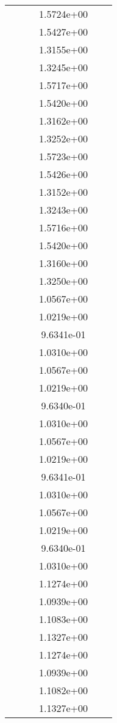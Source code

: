 \begin{xltabular}{\textwidth}{r|rS[table-format=1.3e+2]S[table-format=1.4e+2]S[table-format=1.4e+2]S[table-format=-1.5]}
&  &  & 1.5724e+00 & & \\
&  &  & 1.5427e+00 & & \\
&  &  & 1.3155e+00 & & \\
&  &  & 1.3245e+00 & & \\
&  &  & 1.5717e+00 & & \\
&  &  & 1.5420e+00 & & \\
&  &  & 1.3162e+00 & & \\
&  &  & 1.3252e+00 & & \\
&  &  & 1.5723e+00 & & \\
&  &  & 1.5426e+00 & & \\
&  &  & 1.3152e+00 & & \\
&  &  & 1.3243e+00 & & \\
&  &  & 1.5716e+00 & & \\
&  &  & 1.5420e+00 & & \\
&  &  & 1.3160e+00 & & \\
&  &  & 1.3250e+00 & & \\
&  &  & 1.0567e+00 & & \\
&  &  & 1.0219e+00 & & \\
&  &  & 9.6341e-01 & & \\
&  &  & 1.0310e+00 & & \\
&  &  & 1.0567e+00 & & \\
&  &  & 1.0219e+00 & & \\
&  &  & 9.6340e-01 & & \\
&  &  & 1.0310e+00 & & \\
&  &  & 1.0567e+00 & & \\
&  &  & 1.0219e+00 & & \\
&  &  & 9.6341e-01 & & \\
&  &  & 1.0310e+00 & & \\
&  &  & 1.0567e+00 & & \\
&  &  & 1.0219e+00 & & \\
&  &  & 9.6340e-01 & & \\
&  &  & 1.0310e+00 & & \\
&  &  & 1.1274e+00 & & \\
&  &  & 1.0939e+00 & & \\
&  &  & 1.1083e+00 & & \\
&  &  & 1.1327e+00 & & \\
&  &  & 1.1274e+00 & & \\
&  &  & 1.0939e+00 & & \\
&  &  & 1.1082e+00 & & \\
&  &  & 1.1327e+00 & & \\

\end{xltabular}
